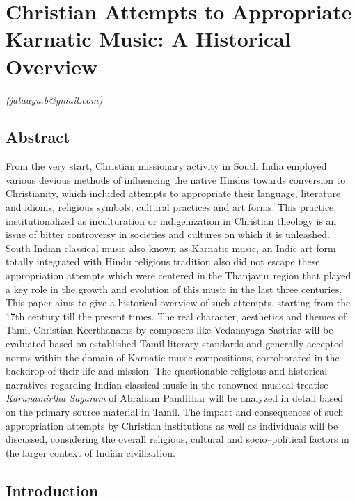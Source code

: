 
\chapter{Christian Attempts to Appropriate Karnatic Music: A Historical Overview}\label{chapter5}


\begin{flushright}
\textit{(jataayu.b@gmail.com)}
\end{flushright}


\section*{Abstract}

From the very start, Christian missionary activity in South India employed various devious methods of influencing the native Hindus towards conversion to Christianity, which included attempts to appropriate their language, literature and idioms, religious symbols, cultural practices and art forms. This practice, institutionalized as inculturation or indigenization in Christian theology is an issue of bitter controversy in societies and cultures on which it is unleashed. South Indian classical music also known as Karnatic music, an Indic art form totally integrated with Hindu religious tradition also did not escape these appropriation attempts which were centered in the Thanjavur region that played a key role in the growth and evolution of this music in the last three centuries. This paper aims to give a historical overview of such attempts, starting from the 17th century till the present times. The real character, aesthetics and themes of Tamil Christian Keerthanams by composers like Vedanayaga Sastriar will be evaluated based on established Tamil literary standards and generally accepted norms within the domain of Karnatic music compositions, corroborated in the backdrop of their life and mission. The questionable religious and historical narratives regarding Indian classical music in the renowned musical treatise \textit{Karunamirtha Sagaram} of Abraham Pandithar will be analyzed in detail based on the primary source material in Tamil. The impact and consequences of such appropriation attempts by Christian institutions as well as individuals will be discussed, considering the overall religious, cultural and socio–political factors in the larger context of Indian civilization.


\section*{Introduction}

